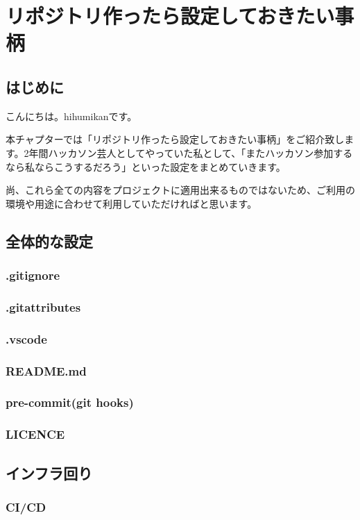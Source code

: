 \chapter{リポジトリ作ったら設定しておきたい事柄}
\section{はじめに}
こんにちは。hihumikanです。

本チャプターでは「リポジトリ作ったら設定しておきたい事柄」をご紹介致します。2年間ハッカソン芸人としてやっていた私として、「またハッカソン参加するなら私ならこうするだろう」といった設定をまとめていきます。

尚、これら全ての内容をプロジェクトに適用出来るものではないため、ご利用の環境や用途に合わせて利用していただければと思います。

\section{全体的な設定}

\subsection{.gitignore}
\subsection{.gitattributes}
\subsection{.vscode}
\subsection{README.md}
\subsection{pre-commit(git hooks)}
\subsection{LICENCE}

\section{インフラ回り}

\subsection{CI/CD}

